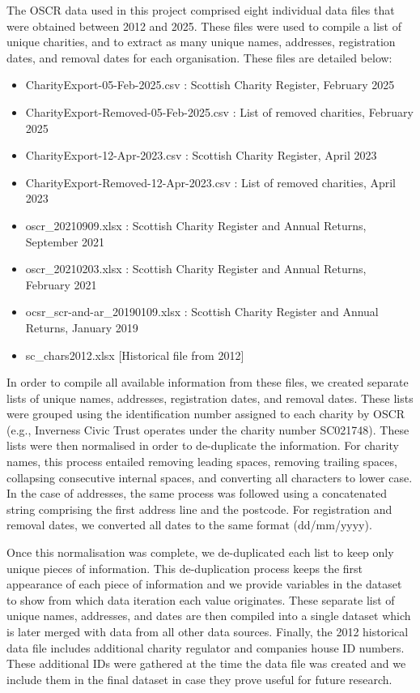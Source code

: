 \documentclass{article}
\begin{document}
The OSCR data used in this project comprised eight individual data files that were obtained
between 2012 and 2025. These files were used to compile a list of unique charities, and to
extract   as   many   unique   names,   addresses,   registration   dates,   and   removal   dates   for   each
organisation. These files are detailed below: 
\begin{itemize}
  \item CharityExport-05-Feb-2025.csv : Scottish Charity Register, February 2025
  \item CharityExport-Removed-05-Feb-2025.csv : List of removed charities, February 2025
  \item CharityExport-12-Apr-2023.csv : Scottish Charity Register, April 2023
  \item CharityExport-Removed-12-Apr-2023.csv : List of removed charities, April 2023
  \item oscr\_20210909.xlsx : Scottish Charity Register and Annual Returns, September 2021
  \item oscr\_20210203.xlsx : Scottish Charity Register and Annual Returns, February 2021
  \item ocsr\_scr-and-ar\_20190109.xlsx   : Scottish   Charity   Register   and   Annual   Returns,
January 2019
  \item sc\_chars2012.xlsx [Historical file from 2012]
\end{itemize}
In order to compile all available information from these files, we created separate lists of unique
names, addresses, registration dates, and removal dates. These lists were grouped using the
identification number assigned to each charity by OSCR (e.g., Inverness Civic Trust operates
under the charity number SC021748). These lists were then normalised in order to de-duplicate
the information. For charity names, this process entailed removing leading spaces, removing
trailing spaces, collapsing consecutive internal spaces, and converting all characters to lower
case. In the case of addresses, the same process was followed using a concatenated string
comprising the first address line and the postcode. For registration and removal dates, we
converted all dates to the same format (dd/mm/yyyy). 

Once this normalisation was complete, we de-duplicated each list to keep only unique pieces of
information.   This   de-duplication   process   keeps   the   first   appearance   of   each   piece   of
information and we provide variables in the dataset to show from which data iteration each
value originates. These separate list of unique names, addresses, and dates are then compiled
into a single dataset which is later merged with data from all other data sources.
Finally, the 2012 historical data file includes additional charity regulator and companies house
ID numbers. These additional IDs were gathered at the time the data file was created and we
include them in the final dataset in case they prove useful for future research.
\end{document}
